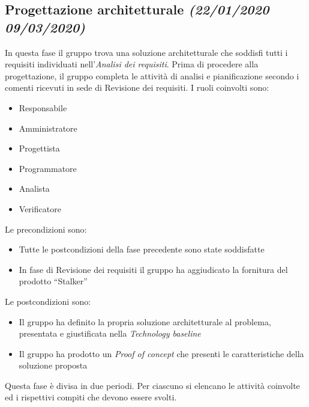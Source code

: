 \documentclass[../piano-di-progetto.tex]{subfiles}
\begin{document}
\subsection[Progettazione architetturale]{Progettazione architetturale {\normalsize\normalfont\itshape(22/01/2020  09/03/2020)}}%
\label{sub:progettazione_architetturale}
In questa fase il gruppo trova una soluzione architetturale che soddisfi tutti i requisiti individuati nell'\textit{Analisi dei requisiti}.
Prima di procedere alla progettazione, il gruppo completa le attività di analisi e pianificazione secondo i comenti ricevuti in sede di Revisione dei requisiti.
I ruoli coinvolti sono:
\begin{itemize}
  \item Responsabile
  \item Amministratore
  \item Progettista
  \item Programmatore
  \item Analista
  \item Verificatore
\end{itemize}
Le precondizioni sono:
\begin{itemize}
  \item Tutte le postcondizioni della fase precedente sono state soddisfatte
  \item In fase di Revisione dei requisiti il gruppo ha aggiudicato la fornitura del prodotto ``Stalker''
\end{itemize}
Le postcondizioni sono:
\begin{itemize}
  \item Il gruppo ha definito la propria soluzione architetturale al problema, presentata e giustificata nella \textit{Technology baseline}
  \item Il gruppo ha prodotto un \textit{Proof of concept} che presenti le caratteristiche della soluzione proposta
\end{itemize}
Questa fase è divisa in due periodi.
Per ciascuno si elencano le attività coinvolte ed i rispettivi compiti che devono essere svolti.
\end{document}
